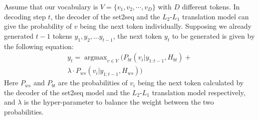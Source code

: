 Assume that our vocabulary is $V = \{v_1, v_2, \cdots, v_D\}$ with $D$ different tokens. In decoding step $t$, the decoder of the set2seq and the $L_2$-$L_1$ translation model can give the probability of $v$ being the next token individually. Supposing we already generated $t-1$ tokens $y_1, y_2, ... y_{t-1}$, the next token $y_t$ to be generated is given by the following equation:
\begin{multline}
y_t = \mathop{\arg\max}_{v \in V} \big( P_{bt}\left( v_i|y_{1:t-1},H_{bt}\right) + \\
  \lambda \cdot P_{ws}\left( v_i|y_{1:t-1},H_{ws} \right)\big)
\label{eq:pro}
\end{multline}
Here $P_{ws}$ and $P_{bt}$ are the probabilities of $v_i$ being 
the next token calculated by the decoder of the set2seq model 
and the $L_2$-$L_1$ translation model respectively, and $\lambda$ is 
the hyper-parameter to balance the weight between the two probabilities. 




